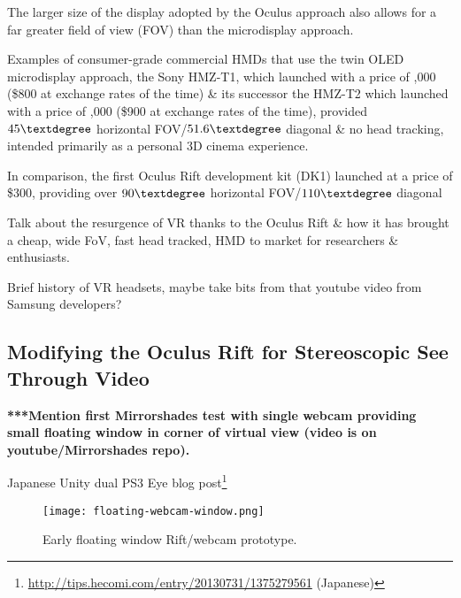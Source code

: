 The larger size of the display adopted by the Oculus approach also allows for a far greater field of view (FOV) than the microdisplay approach.

Examples of consumer-grade commercial HMDs that use the twin OLED microdisplay approach, the Sony HMZ-T1, which launched with a price of ,000 (\$800 at exchange rates of the time) \& its successor the HMZ-T2 which launched with a price of ,000 (\$900 at exchange rates of the time), provided $45\textdegree$ horizontal FOV/$51.6\textdegree$ diagonal \& no head tracking, intended primarily as a personal 3D cinema experience.



In comparison, the first Oculus Rift development kit (DK1) launched at a price of \$300, providing over $90\textdegree$ horizontal FOV/$110\textdegree$ diagonal



Talk about the resurgence of VR thanks to the Oculus Rift \& how it has brought a cheap, wide FoV, fast head tracked, HMD to market for researchers \& enthusiasts.

Brief history of VR headsets, maybe take bits from that youtube video from Samsung developers?


\subsection{Modifying the Oculus Rift for Stereoscopic See Through Video}

\textbf{***Mention first Mirrorshades test with single webcam providing small floating window in corner of virtual view (video is on youtube/Mirrorshades repo).}

\newcommand{\floatingwebcamFootnote}{\footnote{\url{https://www.youtube.com/watch?v=tS0FGZxQzCU}}}


Japanese Unity dual PS3 Eye blog post\footnote{\url{http://tips.hecomi.com/entry/20130731/1375279561} (Japanese)}


\begin{figure}[h]
	\begin{center}
		\texttt{[image: floating-webcam-window.png]}
		\caption{Early floating window Rift/webcam prototype.}
		\label{floating-webcam-window.png}
	\end{center}
\end{figure}

